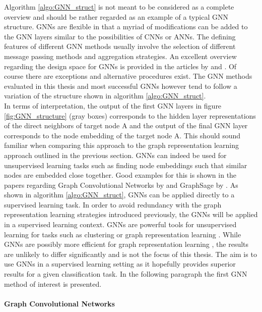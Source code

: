 	\noindent Algorithm \ref{algo:GNN_struct} is not meant to be considered as
	a complete overview and should be rather regarded as an example of a typical 
	GNN structure. GNNs are flexible in that a myriad of modifications can be 
	added to the GNN layers similar to the possibilities of CNNs or ANNs. The 
	defining features of different GNN methods usually involve the selection of 
	different message passing methods and aggregation strategies. An excellent 
	overview regarding the design space for GNNs is provided in the articles by
	\cite{you2020design} and \cite{zhou2020graph}.
	Of course there are exceptions and alternative procedures exist. The GNN 
	methods evaluated in this thesis and most successful GNNs however tend to 
	follow a variation of the structure shown in algorithm 
	\ref{algo:GNN_struct}.  \\

	\noindent In terms of interpretation, the output of the first GNN layers in
	figure \ref{fig:GNN_structure} (gray boxes) corresponds to the hidden layer 
	representations of the direct neighbors of target node A and the output of 
	the final GNN layer corresponds to the node embedding of the target node A. 
	This should sound familiar when comparing this approach to the graph 
	representation learning approach outlined in the previous section. 
	GNNs can indeed be used for unsupervised learning tasks such as finding node 
	embeddings such that similar nodes are embedded close together. Good
	examples for this is shown in the papers regarding Graph Convolutional
	Networks by \cite{kipf2016semi} and GraphSage by
	\cite{hamilton2017inductive}. As shown in algorithm \ref{algo:GNN_struct},
	GNNs can be applied directly to a supervised learning task. In order to
	avoid redundancy with the graph representation learning strategies
	introduced previously, the GNNs will be applied in a supervised learning
	context. GNNs are powerful tools for unsupervised learning for tasks such
	as clustering or graph representation learning \citep{zhou2020graph}. While
	GNNs are possibly more efficient for graph representation learning 
	\citep[p. 12-13]{kipf2016semi}, the results are unlikely to differ 
	significantly and is not the focus of this thesis. The aim is to use GNNs
	in a supervised learning setting as it hopefully provides superior results
	for a given classification task. In the following paragraph the first GNN 
	method of interest is presented. 


	\paragraph{Graph Convolutional Networks}\mbox{}\\
	
